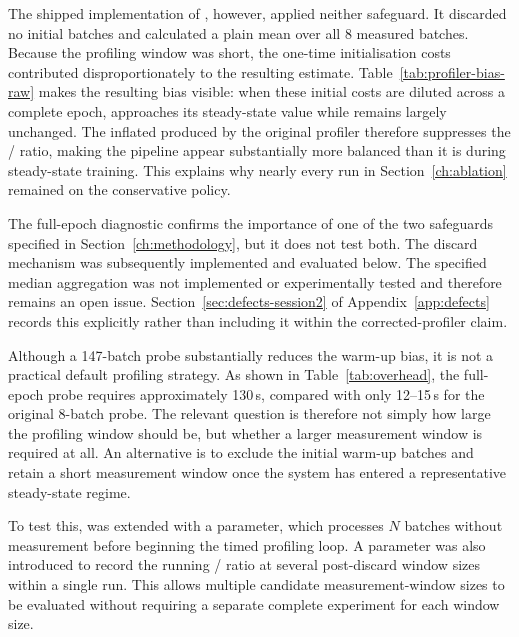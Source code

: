 The shipped implementation of , however, applied neither safeguard. It discarded no initial batches and calculated a plain mean over all 8 measured batches. Because the profiling window was short, the one-time initialisation costs contributed disproportionately to the resulting \Tgpu{} estimate. Table~\ref{tab:profiler-bias-raw} makes the resulting bias visible: when these initial costs are diluted across a complete epoch, \Tgpu{} approaches its steady-state value while \Tdata{} remains largely unchanged. The inflated \Tgpu{} produced by the original profiler therefore suppresses the \Tdata{}/\Tgpu{} ratio, making the pipeline appear substantially more balanced than it is during steady-state training. This explains why nearly every run in Section~\ref{ch:ablation} remained on the conservative  policy.

The full-epoch diagnostic confirms the importance of one of the two safeguards specified in Section~\ref{ch:methodology}, but it does not test both. The discard mechanism was subsequently implemented and evaluated below. The specified median aggregation was not implemented or experimentally tested and therefore remains an open issue. Section~\ref{sec:defects-session2} of Appendix~\ref{app:defects} records this explicitly rather than including it within the corrected-profiler claim.

Although a 147-batch probe substantially reduces the warm-up bias, it is not a practical default profiling strategy. As shown in Table~\ref{tab:overhead}, the full-epoch probe requires approximately 130\,s, compared with only 12--15\,s for the original 8-batch probe. The relevant question is therefore not simply how large the profiling window should be, but whether a larger measurement window is required at all. An alternative is to exclude the initial warm-up batches and retain a short measurement window once the system has entered a representative steady-state regime.

To test this,  was extended with a  parameter, which processes $N$ batches without measurement before beginning the timed profiling loop. A  parameter was also introduced to record the running \Tdata{}/\Tgpu{} ratio at several post-discard window sizes within a single run. This allows multiple candidate measurement-window sizes to be evaluated without requiring a separate complete experiment for each window size.

